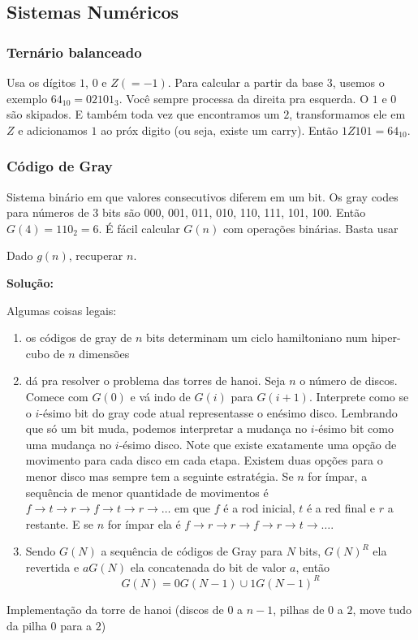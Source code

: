 \subsection{Sistemas Numéricos}

\subsubsection{Ternário balanceado}

Usa os dígitos $1$, $0$ e $Z(=-1)$. Para calcular a partir da base $3$, usemos o exemplo $64_{10} = 02101_3$. Você sempre processa da direita pra esquerda. O $1$ e $0$ são skipados. E também toda vez que encontramos um $2$, transformamos ele em $Z$ e adicionamos $1$ ao próx digito (ou seja, existe um carry). Então $1Z101 = 64_{10}$.

\subsubsection{Código de Gray}

Sistema binário em que valores consecutivos diferem em um bit. Os gray codes para números de $3$ bits são 000, 001, 011, 010, 110, 111, 101, 100. Então $G(4) = 110_2 = 6$. É fácil calcular $G(n)$ com operações binárias. Basta usar


 Dado $g(n)$, recuperar $n$.

\textbf{Solução:}


Algumas coisas legais: 

\begin{enumerate}
    \item os códigos de gray de $n$ bits determinam um ciclo hamiltoniano num hiper-cubo de $n$ dimensões
    \item dá pra resolver o problema das torres de hanoi. Seja $n$ o número de discos. Comece com $G(0)$ e vá indo de $G(i)$ para $G(i+1)$. Interprete como se o $i$-ésimo bit do gray code atual representasse o enésimo disco. Lembrando que só um bit muda, podemos interpretar a mudança no $i$-ésimo bit como uma mudança no $i$-ésimo disco. Note que existe exatamente uma opção de movimento para cada disco em cada etapa. Existem duas opções para o menor disco mas sempre tem a seguinte estratégia. Se $n$ for ímpar, a sequência de menor quantidade de movimentos é $f \to t \to r \to f \to t \to r \to \dots$ em que $f$ é a rod inicial, $t$ é a red final e $r$ a restante. E se $n$ for ímpar ela é $f \to r \to r \to f \to r \to t \to \dots$.
    \item Sendo $G(N)$ a sequência de códigos de Gray para $N$ bits, $G(N)^R$ ela revertida e $aG(N)$ ela concatenada do bit de valor $a$, então
    $$ G(N) = 0G(N-1) \cup 1G(N-1)^R$$
\end{enumerate}

Implementação da torre de hanoi (discos de $0$ a $n-1$, pilhas de $0$ a $2$, move tudo da pilha $0$ para a $2$)

